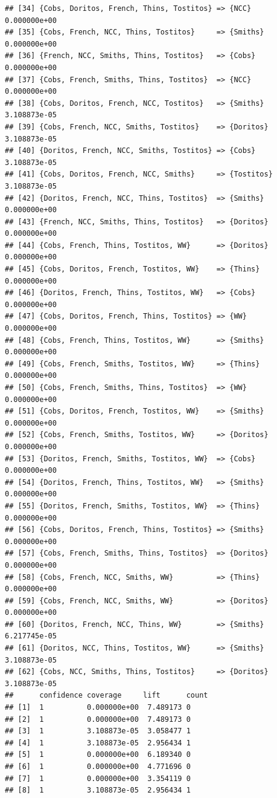 \documentclass[
]{article}
\begin{document}
\begin{verbatim}
## [34] {Cobs, Doritos, French, Thins, Tostitos} => {NCC}      0.000000e+00
## [35] {Cobs, French, NCC, Thins, Tostitos}     => {Smiths}   0.000000e+00
## [36] {French, NCC, Smiths, Thins, Tostitos}   => {Cobs}     0.000000e+00
## [37] {Cobs, French, Smiths, Thins, Tostitos}  => {NCC}      0.000000e+00
## [38] {Cobs, Doritos, French, NCC, Tostitos}   => {Smiths}   3.108873e-05
## [39] {Cobs, French, NCC, Smiths, Tostitos}    => {Doritos}  3.108873e-05
## [40] {Doritos, French, NCC, Smiths, Tostitos} => {Cobs}     3.108873e-05
## [41] {Cobs, Doritos, French, NCC, Smiths}     => {Tostitos} 3.108873e-05
## [42] {Doritos, French, NCC, Thins, Tostitos}  => {Smiths}   0.000000e+00
## [43] {French, NCC, Smiths, Thins, Tostitos}   => {Doritos}  0.000000e+00
## [44] {Cobs, French, Thins, Tostitos, WW}      => {Doritos}  0.000000e+00
## [45] {Cobs, Doritos, French, Tostitos, WW}    => {Thins}    0.000000e+00
## [46] {Doritos, French, Thins, Tostitos, WW}   => {Cobs}     0.000000e+00
## [47] {Cobs, Doritos, French, Thins, Tostitos} => {WW}       0.000000e+00
## [48] {Cobs, French, Thins, Tostitos, WW}      => {Smiths}   0.000000e+00
## [49] {Cobs, French, Smiths, Tostitos, WW}     => {Thins}    0.000000e+00
## [50] {Cobs, French, Smiths, Thins, Tostitos}  => {WW}       0.000000e+00
## [51] {Cobs, Doritos, French, Tostitos, WW}    => {Smiths}   0.000000e+00
## [52] {Cobs, French, Smiths, Tostitos, WW}     => {Doritos}  0.000000e+00
## [53] {Doritos, French, Smiths, Tostitos, WW}  => {Cobs}     0.000000e+00
## [54] {Doritos, French, Thins, Tostitos, WW}   => {Smiths}   0.000000e+00
## [55] {Doritos, French, Smiths, Tostitos, WW}  => {Thins}    0.000000e+00
## [56] {Cobs, Doritos, French, Thins, Tostitos} => {Smiths}   0.000000e+00
## [57] {Cobs, French, Smiths, Thins, Tostitos}  => {Doritos}  0.000000e+00
## [58] {Cobs, French, NCC, Smiths, WW}          => {Thins}    0.000000e+00
## [59] {Cobs, French, NCC, Smiths, WW}          => {Doritos}  0.000000e+00
## [60] {Doritos, French, NCC, Thins, WW}        => {Smiths}   6.217745e-05
## [61] {Doritos, NCC, Thins, Tostitos, WW}      => {Smiths}   3.108873e-05
## [62] {Cobs, NCC, Smiths, Thins, Tostitos}     => {Doritos}  3.108873e-05
##      confidence coverage     lift      count
## [1]  1          0.000000e+00  7.489173 0    
## [2]  1          0.000000e+00  7.489173 0    
## [3]  1          3.108873e-05  3.058477 1    
## [4]  1          3.108873e-05  2.956434 1    
## [5]  1          0.000000e+00  6.189340 0    
## [6]  1          0.000000e+00  4.771696 0    
## [7]  1          0.000000e+00  3.354119 0    
## [8]  1          3.108873e-05  2.956434 1    

\end{verbatim}
\end{document}
